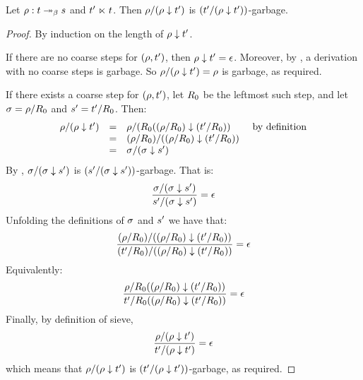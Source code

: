 \begin{lemma}
Let $\rho : t \mathrel{\twoheadrightarrow_\beta} s$ and $t' \mathrel{\ltimes} t$.
Then $\rho/(\rho \downarrow t')$ is $(t'/(\rho \downarrow t'))$-garbage.
\end{lemma}
\begin{proof}
By induction on the length of $\rho \downarrow t'$.

If there are no coarse steps for $(\rho,t')$,
then $\rho \downarrow t' = \epsilon$.
Moreover, by , a derivation with no
coarse steps is garbage. So $\rho/(\rho \downarrow t') = \rho$
is garbage, as required.

If there exists a coarse step for $(\rho,t')$,
let $R_0$ be the leftmost such step,
and let $\sigma = \rho/R_0$ and $s' = t'/R_0$.
Then:
\[
  \begin{array}{rcll}
  \rho/(\rho \downarrow t')
  & = & \rho/(R_0((\rho/R_0) \downarrow (t'/R_0)) & \text{ by definition} \\
  & = & (\rho/R_0)/((\rho/R_0) \downarrow (t'/R_0)) \\
  & = & \sigma/(\sigma \downarrow s') \\
  \end{array}
\]
By \ih, $\sigma/(\sigma \downarrow s')$ is $(s'/(\sigma \downarrow s'))$-garbage.
That is:
\[
  \frac{
    \sigma/(\sigma \downarrow s')
  }{
    s'/(\sigma \downarrow s')
  } = \epsilon
\]
Unfolding the definitions of $\sigma$ and $s'$ we have
that:
\[
  \frac{
    (\rho/R_0)/((\rho/R_0) \downarrow (t'/R_0))
  }{
    (t'/R_0)/((\rho/R_0) \downarrow (t'/R_0))
  } = \epsilon
\]
Equivalently:
\[
  \frac{
    \rho/R_0((\rho/R_0) \downarrow (t'/R_0))
  }{
    t'/R_0((\rho/R_0) \downarrow (t'/R_0))
  } = \epsilon
\]
Finally, by definition of sieve,
\[
  \frac{
    \rho/(\rho \downarrow t')
  }{
    t'/(\rho \downarrow t')
  } = \epsilon
\]
which means that $\rho/(\rho \downarrow t')$ is $(t'/(\rho \downarrow t'))$-garbage,
as required.
\end{proof}

